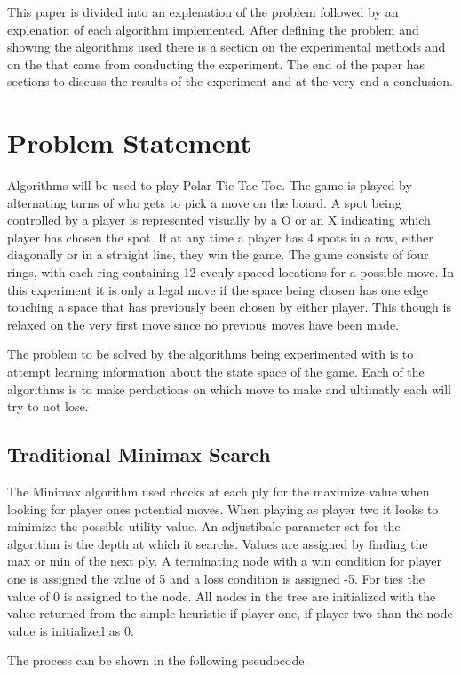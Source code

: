 \documentclass[12pt,letterpaper]{article}
\begin{document}
This paper is divided into an explenation of the problem followed by an explenation of each algorithm implemented. After defining the problem and showing the algorithms used there is a section on the experimental methods and on the that came from conducting the experiment. The end of the paper has sections to discuss the results of the experiment and at the very end a conclusion.


\section{Problem Statement}
Algorithms will be used to play Polar Tic-Tac-Toe. The game is played by alternating turns of who gets to pick a move on the board. A spot being controlled by a player is represented visually by a O or an X indicating which player has chosen the spot. If at any time a player has 4 spots in a row, either diagonally or in a straight line, they win the game. The game consists of four rings, with each ring containing 12 evenly spaced locations for a possible move. In this experiment it is only a legal move if the space being chosen has one edge touching a space that has previously been chosen by either player. This though is relaxed on the very first move since no previous moves have been made.

The problem to be solved by the algorithms being experimented with is to attempt learning information about the state space of the game. Each of the algorithms is to make perdictions on which move to make and ultimatly each will try to not lose.

\subsection{Traditional Minimax Search}
The Minimax algorithm used checks at each ply for the maximize value when looking for player ones potential moves. When playing as player two it looks to minimize the possible utility value. An adjustibale parameter set for the algorithm is the depth at which it searchs. Values are assigned by finding the max or min of the next ply. A terminating node with a win condition for player one is assigned the value of 5 and a loss condition is assigned -5. For ties the value of 0 is assigned to the node. All nodes in the tree are initialized with the value returned from the simple heuristic if player one, if player two than the node value is initialized as 0.

The process can be shown in the following pseudocode. \cite{textBook} \newline 
\end{document}
